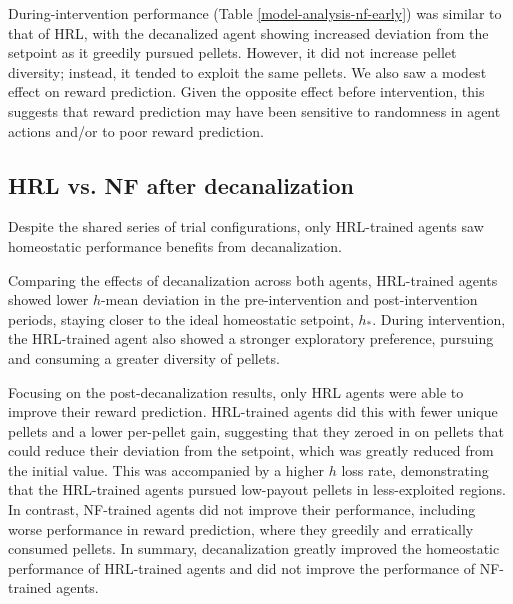 \documentclass[12pt,fleqn]{article}
\begin{document}
During-intervention performance (Table \ref{model-analysis-nf-early}) was similar to that of HRL, with the decanalized agent showing increased deviation from the setpoint as it greedily pursued pellets. However, it did not increase pellet diversity; instead, it tended to exploit the same pellets. We also saw a modest effect on reward prediction. Given the opposite effect before intervention, this suggests that reward prediction may have been sensitive to randomness in agent actions and/or to poor reward prediction.

\subsection{HRL vs. NF after decanalization}



Despite the shared series of trial configurations, only HRL-trained agents saw homeostatic performance benefits from decanalization.

Comparing the effects of decanalization across both agents, HRL-trained agents showed lower \(h\)-mean deviation in the pre-intervention and post-intervention periods, staying closer to the ideal homeostatic setpoint, \(h_*\). During intervention, the HRL-trained agent also showed a stronger exploratory preference, pursuing and consuming a greater diversity of pellets.

Focusing on the post-decanalization results, only HRL agents were able to improve their reward prediction. HRL-trained agents did this with fewer unique pellets and a lower per-pellet gain, suggesting that they zeroed in on pellets that could reduce their deviation from the setpoint, which was greatly reduced from the initial value. This was accompanied by a higher \(h\) loss rate, demonstrating that the HRL-trained agents pursued low-payout pellets in less-exploited regions. In contrast, NF-trained agents did not improve their performance, including worse performance in reward prediction, where they greedily and erratically consumed pellets. In summary, decanalization greatly improved the homeostatic performance of HRL-trained agents and did not improve the performance of NF-trained agents.
\end{document}
